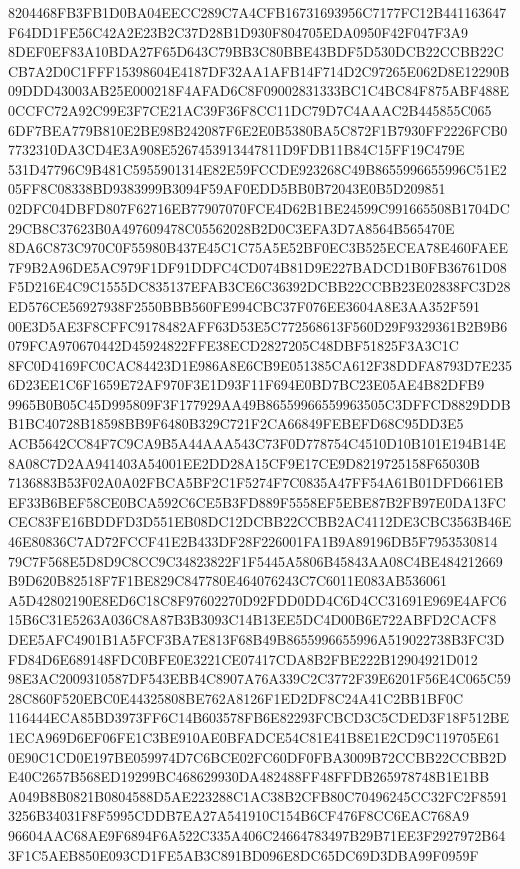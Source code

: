 \documentclass[UTF8,fontset=fandol,zihao=-4,a4paper]{ctexart}
\begin{document}
{{8204468FB3FB1D0BA04EECC289C7A4CFB16731693956C7177FC12B441163647F64DD1FE56C42A2E23B2C37D28B1D930F804705EDA0950F42F047F3A9
8DEF0EF83A10BDA27F65D643C79BB3C80BBE43BDF5D530DCB22CCBB22CCB7A2D0C1FFF15398604E4187DF32AA1AFB14F714D2C97265E062D8E12290B
09DDD43003AB25E000218F4AFAD6C8F09002831333BC1C4BC84F875ABF488E0CCFC72A92C99E3F7CE21AC39F36F8CC11DC79D7C4AAAC2B445855C065
6DF7BEA779B810E2BE98B242087F6E2E0B5380BA5C872F1B7930FF2226FCB07732310DA3CD4E3A908E5267453913447811D9FDB11B84C15FF19C479E
531D47796C9B481C5955901314E82E59FCCDE923268C49B8655996655996C51E205FF8C08338BD9383999B3094F59AF0EDD5BB0B72043E0B5D209851
02DFC04DBFD807F62716EB77907070FCE4D62B1BE24599C991665508B1704DC29CB8C37623B0A497609478C05562028B2D0C3EFA3D7A8564B565470E
8DA6C873C970C0F55980B437E45C1C75A5E52BF0EC3B525ECEA78E460FAEE7F9B2A96DE5AC979F1DF91DDFC4CD074B81D9E227BADCD1B0FB36761D08
F5D216E4C9C1555DC835137EFAB3CE6C36392DCBB22CCBB23E02838FC3D28ED576CE56927938F2550BBB560FE994CBC37F076EE3604A8E3AA352F591
00E3D5AE3F8CFFC9178482AFF63D53E5C772568613F560D29F9329361B2B9B6079FCA970670442D45924822FFE38ECD2827205C48DBF51825F3A3C1C
8FC0D4169FC0CAC84423D1E986A8E6CB9E051385CA612F38DDFA8793D7E2356D23EE1C6F1659E72AF970F3E1D93F11F694E0BD7BC23E05AE4B82DFB9
9965B0B05C45D995809F3F177929AA49B86559966559963505C3DFFCD8829DDBB1BC40728B18598BB9F6480B329C721F2CA66849FEBEFD68C95DD3E5
ACB5642CC84F7C9CA9B5A44AAA543C73F0D778754C4510D10B101E194B14E8A08C7D2AA941403A54001EE2DD28A15CF9E17CE9D8219725158F65030B
7136883B53F02A0A02FBCA5BF2C1F5274F7C0835A47FF54A61B01DFD661EBEF33B6BEF58CE0BCA592C6CE5B3FD889F5558EF5EBE87B2FB97E0DA13FC
CEC83FE16BDDFD3D551EB08DC12DCBB22CCBB2AC4112DE3CBC3563B46E46E80836C7AD72FCCF41E2B433DF28F226001FA1B9A89196DB5F7953530814
79C7F568E5D8D9C8CC9C34823822F1F5445A5806B45843AA08C4BE484212669B9D620B82518F7F1BE829C847780E464076243C7C6011E083AB536061
A5D42802190E8ED6C18C8F97602270D92FDD0DD4C6D4CC31691E969E4AFC615B6C31E5263A036C8A87B3B3093C14B13EE5DC4D00B6E722ABFD2CACF8
DEE5AFC4901B1A5FCF3BA7E813F68B49B8655996655996A519022738B3FC3DFD84D6E689148FDC0BFE0E3221CE07417CDA8B2FBE222B12904921D012
98E3AC2009310587DF543EBB4C8907A76A339C2C3772F39E6201F56E4C065C5928C860F520EBC0E44325808BE762A8126F1ED2DF8C24A41C2BB1BF0C
116444ECA85BD3973FF6C14B603578FB6E82293FCBCD3C5CDED3F18F512BE1ECA969D6EF06FE1C3BE910AE0BFADCE54C81E41B8E1E2CD9C119705E61
0E90C1CD0E197BE059974D7C6BCE02FC60DF0FBA3009B72CCBB22CCBB2DE40C2657B568ED19299BC468629930DA482488FF48FFDB265978748B1E1BB
A049B8B0821B0804588D5AE223288C1AC38B2CFB80C70496245CC32FC2F85913256B34031F8F5995CDDB7EA27A541910C154B6CF476F8CC6EAC768A9
96604AAC68AE9F6894F6A522C335A406C24664783497B29B71EE3F2927972B643F1C5AEB850E093CD1FE5AB3C891BD096E8DC65DC69D3DBA99F0959F
}}
\end{document}
